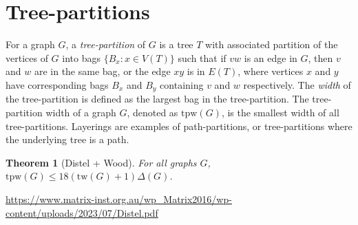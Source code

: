 \documentclass[]{article}
\newcommand{\tw}{\text{tw}}
\newcommand{\tpw}{\text{tpw}}
\newtheorem{theorem}{Theorem}
\theoremstyle{definition}
\numberwithin{theorem}{section}
\numberwithin{equation}{section}
\begin{document}
\section{Tree-partitions}

For a graph $G$, a \textit{tree-partition} of $G$ is a tree $T$ with associated partition of the vertices of $G$ into bags $ \lbrace B_x : x \in V(T) \rbrace$ such that if $vw$ is an edge in $G$, then $v$ and $w$ are in the same bag, or the edge $xy$ is in $E(T)$, where vertices $x$ and $y$ have corresponding bags $B_x$ and $B_y$ containing $v$ and $w$ respectively. The \textit{width} of the tree-partition is defined as the largest bag in the tree-partition. The tree-partition width of a graph $G$, denoted as $\tpw(G)$, is the smallest width of all tree-partitions. Layerings are examples of path-partitions, or tree-partitions where the underlying tree is a path. 


\begin{theorem}[Distel + Wood]
	For all graphs $G$, $\tpw(G) \leq 18 (\tw(G) + 1) \Delta(G)$. 
\end{theorem}
\url{https://www.matrix-inst.org.au/wp_Matrix2016/wp-content/uploads/2023/07/Distel.pdf}
\end{document}
